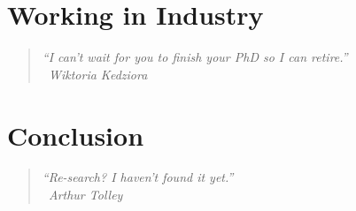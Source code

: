 \documentclass[12pt,twoside]{report} %
\makeatletter
\newcommand{\chapterquote}[2]{
  \begin{quote}
    \color{darkgray}\itshape #1 \\[1ex] %
    \raggedleft %
    \textemdash\ #2
  \end{quote}
}
\renewcommand{\cleardoublepage}{%
  \clearpage%
  \if@twoside
    \ifodd\c@page
    \else
      \hbox{}%
      \thispagestyle{empty}%
      \newpage
    \fi
  \fi
}
\let\oldchapter\chapter
\renewcommand{\chapter}{\cleardoublepage\oldchapter}
\makeatother
\begin{document}
\chapter[Working in Industry]{\label{chapter:8-industry}Working in Industry}
\chapterquote{``I can't wait for you to finish your PhD so I can retire.''}{Wiktoria Kedziora}


\chapter[Conclusion]{\label{chapter:conclusion}Conclusion}
\chapterquote{``Re-search? I haven't found it yet.''}{Arthur Tolley}



% 
% 
\nocite{*}
\printbibliography


\end{document}
